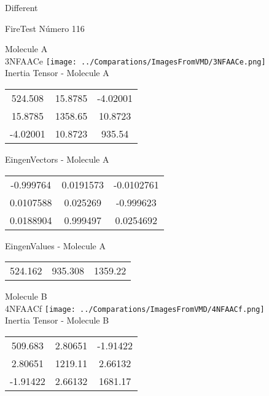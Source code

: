 \begin{center}
\vtab
\vtab
\textcolor{NavyBlue}{\Large Different}
\end{center}

 \newpage

\vtab[-2cm]
\begin{center}
{\large FireTest \tab Número 116}
\end{center}
\begin{multicols}{2}
\begin{center}

Molecule A \\ 
3NFAACe
\texttt{[image: ../Comparations/ImagesFromVMD/3NFAACe.png]}
\\
Inertia Tensor - Molecule A \\
\vtab

\begin{tabular}{|c c c|}
524.508	 & 	15.8785	 & 	-4.02001	 \\
15.8785	 & 	1358.65	 & 	10.8723	 \\
-4.02001	 & 	10.8723	 & 	935.54
\end{tabular}

\vtab
 EingenVectors - Molecule A     \\
\vtab
\begin{tabular}{|c c c|}
-0.999764	 & 	0.0191573	 & 	-0.0102761	 \\
0.0107588	 & 	0.025269	 & 	-0.999623	 \\
0.0188904	 & 	0.999497	 & 	0.0254692
\end{tabular}

\vtab
 EingenValues - Molecule A     \\
\vtab
\begin{tabular}{|c c c|}
524.162	 & 	935.308	 & 	1359.22	 \\
\end{tabular}
\columnbreak

Molecule B \\ 
4NFAACf
\texttt{[image: ../Comparations/ImagesFromVMD/4NFAACf.png]}
\\
Inertia Tensor - Molecule B \\
\vtab

\begin{tabular}{|c c c|}
509.683	 & 	2.80651	 & 	-1.91422	 \\
2.80651	 & 	1219.11	 & 	2.66132	 \\
-1.91422	 & 	2.66132	 & 	1681.17
\end{tabular}


\end{center}
\end{multicols}
